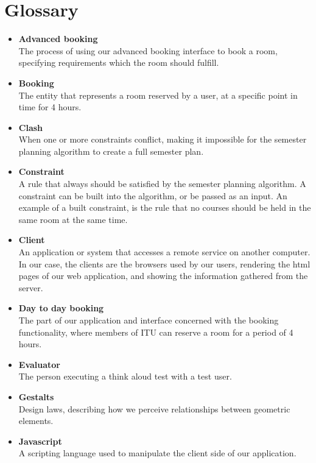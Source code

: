 \section{Glossary}
\label{sec:glossary}
\begin{itemize}
\item \textbf{Advanced booking}\\
The process of using our advanced booking interface to book a room, specifying requirements which the room should fulfill. 
	
\item \textbf{Booking}\\ 
The entity that represents a room reserved by a user, at a specific point in time for 4 hours.

\item \textbf{Clash}\\
When one or more constraints conflict, making it impossible for the semester planning algorithm to create a full semester plan.

\item \textbf{Constraint}\\
A rule that always should be satisfied by the semester planning algorithm. A constraint can be built into the algorithm, or be passed as an input. An example of a built constraint, is the rule that no courses should be held in the same room at the same time.

\item \textbf{Client}\\
An application or system that accesses a remote service on another computer. In our case, the clients are the browsers used by our users, rendering the html pages of our web application, and showing the information gathered from the server.

\item \textbf{Day to day booking}\\
The part of our application and interface concerned with the booking functionality, where members of ITU can reserve a room for a period of 4 hours.

\item \textbf{Evaluator}\\
The person executing a think aloud test with a test user.

\item \textbf{Gestalts}\\
Design laws, describing how we perceive relationships between geometric elements.

\item \textbf{Javascript}\\
A scripting language used to manipulate the client side of our application.
	

\end{itemize}

